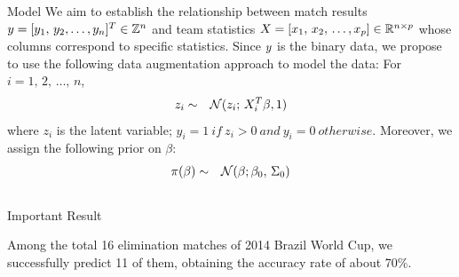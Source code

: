 \documentclass[final]{beamer}
\newlength{\onecolwid}
\newlength{\twocolwid}
\begin{document}
\begin{frame}[t]
\begin{columns}[t]
\begin{column}{\twocolwid}
\begin{columns}[t,totalwidth=\twocolwid]
\begin{column}{\onecolwid}
\begin{block}{Model}
We aim to establish the relationship between match results $\boldmath{y} = [y_1, \, y_2, \ldots, y_n]^T \in \mathbb{Z}^n$ and team statistics $\boldmath{X} = [\boldmath{x}_1, \, \boldmath{x}_2, \, \ldots, \boldmath{x}_p ] \in \mathbb{R}^{n \times p}$ whose columns correspond to specific statistics. Since $\boldmath{y}$ is the binary data, we propose to use the following data augmentation approach to model the data: For $i = 1, \, 2, \, \ldots, \, n$, 
\begin{eqnarray}
z_i &\sim& \mathcal{N} (z_i; \, X_i^T \boldmath{\beta}, 1)
\end{eqnarray}
where $z_i$ is the latent variable; $y_i=1 \ if \ z_i>0 \ and \ y_i=0 \ otherwise.$
Moreover, we assign the following prior on $\mathbb{\beta}$:
\begin{eqnarray}
\pi (\boldmath{\beta}) &\sim& \mathcal{N} (\boldmath{\beta}; \boldmath{\beta}_0, \, \Sigma_0 )
\end{eqnarray}
\end{block}


\end{column} %

\end{columns} %


\begin{alertblock}{Important Result}

Among the total 16 elimination matches of 2014 Brazil World Cup, we successfully predict 11 of them, obtaining the accuracy rate of about 70\%.


\end{alertblock} 


\begin{columns}[t,totalwidth=\twocolwid] %

\begin{column}{\onecolwid} %



\end{column}
\end{columns}
\end{column}
\end{columns}
\end{frame}
\end{document}
